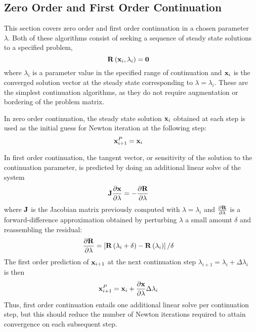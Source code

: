 \subsection{Zero Order and First Order Continuation}
\label{sec:01c}
This section covers zero order and first order continuation in a chosen parameter $\lambda$. Both of these algorithms consist of seeking a sequence of steady state solutions to a specified problem,
\begin{equation}
\label{eq:ri}
{\bf R} \left( {\bf x}_i, \lambda_i \right) = {\bf 0}
\end{equation}
where $\lambda_i$ is a parameter value in the specified range of continuation and ${\bf x}_i$ is the converged solution vector at the steady state corresponding to $\lambda=\lambda_i$. These are the simplest continuation algorithms, as they do not require augmentation or bordering of the problem matrix.

In zero order continuation, the steady state solution ${\bf x}_i$ obtained at each step is used as the initial guess for Newton iteration at the following step:
\begin{equation}
\label{eq:zc}
{\bf x}^P_{i+1} = {\bf x}_i
\end{equation}

In first order continuation, the tangent vector, or sensitivity of the solution to the continuation parameter, is predicted by doing an additional linear solve of the system
\begin{equation}
\label{eq:tsolve}
{\bf J} \frac{\partial {\bf x}}{\partial \lambda} = -\frac{\partial {\bf R}}{\partial \lambda}
\end{equation}
where ${\bf J}$ is the Jacobian matrix previously computed with $\lambda=\lambda_i$ and $\frac{\partial {\bf R}}{\partial \lambda}$ is a forward-difference approximation obtained by perturbing $\lambda$ a small amount $\delta$ and reassembling the residual:
\begin{equation}
\label{eq:fda}
\frac{\partial {\bf R}}{\partial \lambda} = \left[ {\bf R} \left( \lambda_i + \delta \right) - {\bf R} \left( \lambda_i \right) \right] / \delta
\end{equation}
The first order prediction of ${\bf x}_{i+1}$ at the next continuation step $\lambda_{i+1} = \lambda_i + \Delta \lambda_i$ is then
\begin{equation}
\label{eq:fop}
{\bf x}^P_{i+1} = {\bf x}_i + \frac{\partial {\bf x}}{\partial \lambda} \Delta \lambda_i
\end{equation}
Thus, first order continuation entails one additional linear solve per continuation step, but this should reduce the number of Newton iterations required to attain convergence on each subsequent step.

